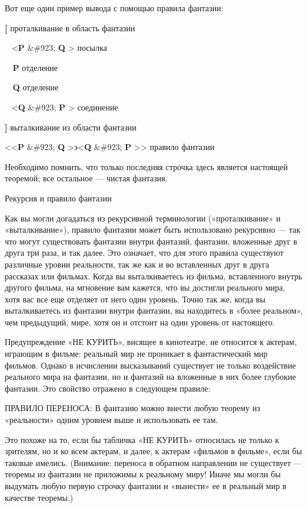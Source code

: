 Вот еще один пример вывода с помощью правила фантазии:

\textbf{{[}} проталкивание в область фантазии

~ \textless{}\textbf{P} \&\#923; \textbf{Q} \textgreater{} посылка

\textbf{~ P} отделение

\textbf{~ Q} отделение

~ \textless{}\textbf{Q} \&\#923; \textbf{P} \textgreater{} соединение

\textbf{{]}} выталкивание из области фантазии

\textless\textless{}\textbf{P} \&\#923; \textbf{Q} \textgreater э\textless{}\textbf{Q} \&\#923; \textbf{P} \textgreater\textgreater{} правило фантазии

Необходимо помнить, что только последняя строчка здесь является настоящей теоремой; все остальное --- чистая фантазия.

Рекурсия и правило фантазии

Как вы могли догадаться из рекурсивной терминологии («проталкивание» и «выталкивание»), правило фантазии может быть использовано рекурсивно --- так что могут существовать фантазии внутри фантазий, фантазии, вложенные друг в друга три раза, и так далее. Это означает, что для этого правила существуют различные уровни реальности, так же как и во вставленных друг в друга рассказах или фильмах. Когда вы выталкиваетесь из фильма, вставленного внутрь другого фильма, на мгновение вам кажется, что вы достигли реального мира, хотя вас все еще отделяет от него один уровень. Точно так же, когда вы выталкиваетесь из фантазии внутри фантазии, вы находитесь в «более реальном», чем предыдущий, мире, хотя он и отстоит на один уровень от настоящего.

Предупреждение «НЕ КУРИТЬ», висящее в кинотеатре, не относится к актерам, играющим в фильме: реальный мир не проникает в фантастический мир фильмов. Однако в исчислении высказываний существует не только воздействие реального мира на фантазии, но и фантазий на вложенные в них более глубокие фантазии. Это свойство отражено в следующем правиле:

ПРАВИЛО ПЕРЕНОСА: В фантазию можно внести любую теорему из «реальности» одним уровнем выше и использовать ее там.

Это похоже на то, если бы табличка «НЕ КУРИТЬ» относилась не только к зрителям, но и ко всем актерам, и далее, к актерам «фильмов в фильме», если бы таковые имелись. (Внимание: переноса в обратном направлении не существует --- теоремы из фантазии не приложимы к реальному миру! Иначе мы могли бы выдумать любую первую строчку фантазии и «вынести» ее в реальный мир в качестве теоремы.)

